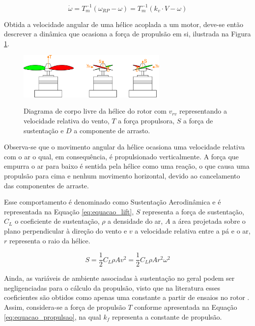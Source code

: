 \documentclass[main.tex]{subfiles}
\begin{document}
\begin{equation}\label{eq:sinal_eletrico_rotor}
	\dot{\omega} = T_m^{-1}(\omega_{RP} - \omega) = T_m^{-1}(k_v \cdot V - \omega)
\end{equation}

Obtida a velocidade angular de uma hélice acoplada a um motor, deve-se então descrever a dinâmica que ocasiona a força de propulsão em si, ilustrada na Figura \ref{fig:lift_forces}.


\begin{figure}[!h]
	\centering
	\caption{Diagrama de corpo livre da hélice do rotor com $v_{rv}$ representando a velocidade relativa do vento, $T$ a força propulsora, $S$ a força de sustentação e $D$ a componente de arrasto.}
	\includegraphics[width=0.65\textwidth]{capitulos/modelagem/imgs/lift_forces.png}
	\label{fig:lift_forces}
\end{figure}

Observa-se que o movimento angular da hélice ocasiona uma velocidade relativa com o ar o qual, em consequência, é propulsionado verticalmente. A força que empurra o ar para baixo é sentida pela hélice como uma reação, o que causa uma propulsão para cima e nenhum movimento horizontal, devido ao cancelamento das componentes de arraste. 

Esse comportamento é denominado como Sustentação Aerodinâmica \cite{fundamentals_aerodynamics} e é representada na Equação \ref{eq:equacao_lift}, $S$ representa a força de sustentação, $C_L$ o coeficiente de sustentação, $\rho$ a densidade do ar, $A$ a área projetada sobre o plano perpendicular à direção do vento e $v$ a velocidade relativa entre a pá e o ar, $r$ representa o raio da hélice.

\begin{equation}\label{eq:equacao_lift}
	S = \frac{1}{2}C_L\rho A v^2 = \frac{1}{2}C_L\rho A r^2 \omega^2
\end{equation}

Ainda, as variáveis de ambiente associadas à sustentação no geral podem ser negligenciadas para o cálculo da propulsão, visto que na literatura esses coeficientes são obtidos como apenas uma constante a partir de ensaios no rotor \cite{muzar2016experimental}. Assim, considera-se a força de propulsão $T$ conforme apresentada na Equação \ref{eq:equacao_propulsao}, na qual $k_f$ representa a constante de propulsão.
\end{document}
